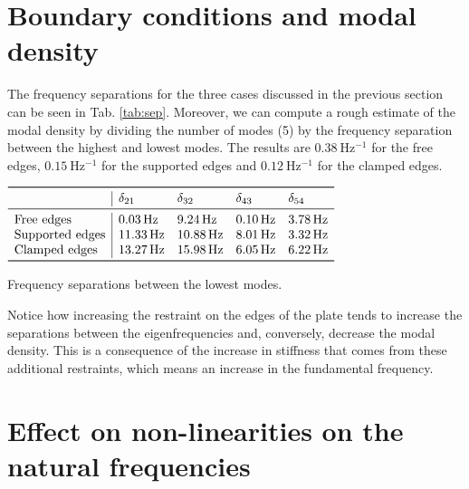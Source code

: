 \documentclass[a4paper]{article}
\begin{document}

\section{Boundary conditions and modal density}

The frequency separations for the three cases discussed in the previous section can be seen in Tab. \ref{tab:sep}. 
Moreover, we can compute a rough estimate of the modal density by dividing the number of modes (5) by the frequency separation between the highest and lowest modes. The results are $0.38~\si{\hertz^{-1}}$ for the free edges, $0.15~\si{\hertz^{-1}}$ for the supported edges and $0.12~\si{\hertz^{-1}}$ for the clamped edges.

\begin{table}[h]
		\centering
		$\begin{array}{l|llll}
			\toprule
			 & \delta_{21} & \delta_{32} & \delta_{43} & \delta_{54}\\
			\midrule
			\text{Free edges} & \SI{0.03}{\hertz} & \SI{9.24}{\hertz} & \SI{0.10}{\hertz}  & \SI{3.78}{\hertz}\\
			\text{Supported edges} & \SI{11.33}{\hertz}  & \SI{10.88}{\hertz}  &  \SI{8.01}{\hertz}  &  \SI{3.32}{\hertz}\\
			\text{Clamped edges} & \SI{13.27}{\hertz} &  \SI{15.98}{\hertz}  &  \SI{6.05}{\hertz}  &  \SI{6.22}{\hertz}\\
			\bottomrule
		\end{array}$
		\caption{Frequency separations between the lowest modes.}
		\label{tab:sep}
\end{table}

Notice how increasing the restraint on the edges of the plate tends to increase the separations between the eigenfrequencies and, conversely, decrease the modal density. This is a consequence of the increase in stiffness that comes from these additional restraints, which means an increase in the fundamental frequency.


\section{Effect on non-linearities on the natural frequencies}
\end{document}

